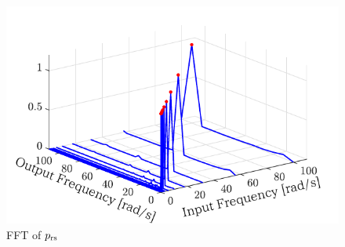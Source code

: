\begin{figure}[t]
    \centering
        \includegraphics[keepaspectratio, scale=1.0]{contents/SystemIdentification/figure/1018FFT_prs.pdf}
        \caption{FFT of $p_\mathrm{rs}$}
        \label{fig:1018FFT_prs}
\end{figure}


